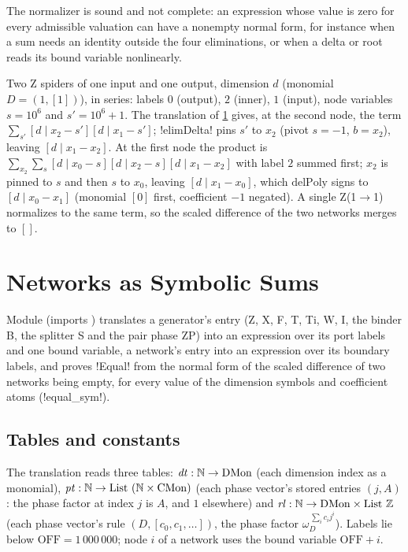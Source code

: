 The normalizer is sound and not complete: an expression whose value is zero for every admissible valuation can have a nonempty normal form, for instance when a sum needs an identity outside the four eliminations, or when a delta or root reads its bound variable nonlinearly.

\begin{example}\label{ex:lean-sym-nf}
Two Z spiders of one input and one output, dimension $d$ (monomial $D=(1,[1])$), in series: labels $0$ (output), $2$ (inner), $1$ (input), node variables $s=10^6$ and $s'=10^6+1$. The translation of \cref{sec:lean-sym-net} gives, at the second node, the term $\sum_{s'}[d\mid x_2-s'][d\mid x_1-s']$; \lean!elimDelta! pins $s'$ to $x_2$ (pivot $s=-1$, $b=x_2$), leaving $[d\mid x_1-x_2]$. At the first node the product is $\sum_{x_2}\sum_s[d\mid x_0-s][d\mid x_2-s][d\mid x_1-x_2]$ with label $2$ summed first; $x_2$ is pinned to $s$ and then $s$ to $x_0$, leaving $[d\mid x_1-x_0]$, which $\mathrm{delPoly}$ signs to $[d\mid x_0-x_1]$ (monomial $[0]$ first, coefficient $-1$ negated). A single Z(1$\to$1) normalizes to the same term, so the scaled difference of the two networks merges to $[]$.
\end{example}

\section{Networks as Symbolic Sums}\label{sec:lean-sym-net}

Module  (imports ) translates a generator's entry (Z, X, F, T, Ti, W, I, the binder B, the splitter S and the pair phase ZP) into an expression over its port labels and one bound variable, a network's entry into an expression over its boundary labels, and proves \lean!Equal! from the normal form of the scaled difference of two networks being empty, for every value of the dimension symbols and coefficient atoms (\lean!equal_sym!).

\subsection{Tables and constants}

The translation reads three tables: $\mathit{dt}:\mathbb{N}\to\mathrm{DMon}$ (each dimension index as a monomial), $\mathit{pt}:\mathbb{N}\to\text{List }(\mathbb{N}\times\mathrm{CMon})$ (each phase vector's stored entries $(j,A)$: the phase factor at index $j$ is $A$, and $1$ elsewhere) and $\mathit{rl}:\mathbb{N}\to\mathrm{DMon}\times\text{List }\mathbb{Z}$ (each phase vector's rule $(D,[c_0,c_1,\dots])$, the phase factor $\omega_D^{\,\sum_i c_ij^i}$). Labels lie below $\mathrm{OFF}=1\,000\,000$; node $i$ of a network uses the bound variable $\mathrm{OFF}+i$.

